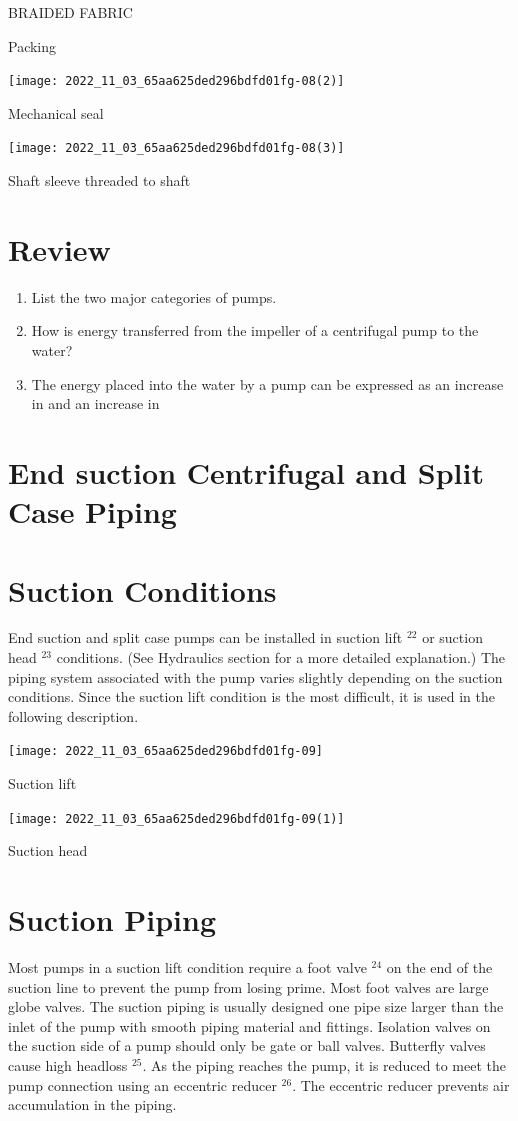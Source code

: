 \documentclass[10pt]{article}
\begin{document}
BRAIDED FABRIC

Packing

\texttt{[image: 2022\_11\_03\_65aa625ded296bdfd01fg-08(2)]}

Mechanical seal

\texttt{[image: 2022\_11\_03\_65aa625ded296bdfd01fg-08(3)]}

Shaft sleeve threaded to shaft

\section{Review}
\begin{enumerate}
  \item List the two major categories of pumps.

  \item How is energy transferred from the impeller of a centrifugal pump to the water?

  \item The energy placed into the water by a pump can be expressed as an increase in and an increase in

\end{enumerate}
\section{End suction Centrifugal and Split Case Piping}
\section{Suction Conditions}
End suction and split case pumps can be installed in suction lift ${ }^{22}$ or suction head ${ }^{23}$ conditions. (See Hydraulics section for a more detailed explanation.) The piping system associated with the pump varies slightly depending on the suction conditions. Since the suction lift condition is the most difficult, it is used in the following description.

\texttt{[image: 2022\_11\_03\_65aa625ded296bdfd01fg-09]}

Suction lift

\texttt{[image: 2022\_11\_03\_65aa625ded296bdfd01fg-09(1)]}

Suction head

\section{Suction Piping}
Most pumps in a suction lift condition require a foot valve $^{24}$ on the end of the suction line to prevent the pump from losing prime. Most foot valves are large globe valves. The suction piping is usually designed one pipe size larger than the inlet of the pump with smooth piping material and fittings. Isolation valves on the suction side of a pump should only be gate or ball valves. Butterfly valves cause high headloss ${ }^{25}$. As the piping reaches the pump, it is reduced to meet the pump connection using an eccentric reducer ${ }^{26}$. The eccentric reducer prevents air accumulation in the piping.
\end{document}
